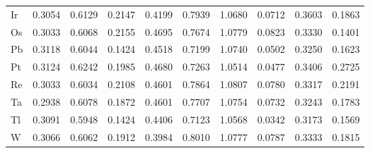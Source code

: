 \documentclass[a4paper, 12pt]{article}
\begin{document}
\begin{table}[htbp]
{\begin{tabular}{l *{9}{l}}
      Ir & 0.3054 & 0.6129 & 0.2147 & 0.4199 & 0.7939 & 1.0680 & 0.0712 & 0.3603 & 0.1863 \\
      Os & 0.3033 & 0.6068 & 0.2155 & 0.4695 & 0.7674 & 1.0779 & 0.0823 & 0.3330 & 0.1401 \\
      Pb & 0.3118 & 0.6044 & 0.1424 & 0.4518 & 0.7199 & 1.0740 & 0.0502 & 0.3250 & 0.1623 \\
      Pt & 0.3124 & 0.6242 & 0.1985 & 0.4680 & 0.7263 & 1.0514 & 0.0477 & 0.3406 & 0.2725 \\
      Re & 0.3033 & 0.6034 & 0.2108 & 0.4601 & 0.7864 & 1.0807 & 0.0780 & 0.3317 & 0.2191 \\
      Ta & 0.2938 & 0.6078 & 0.1872 & 0.4601 & 0.7707 & 1.0754 & 0.0732 & 0.3243 & 0.1783 \\
      Tl & 0.3091 & 0.5948 & 0.1424 & 0.4406 & 0.7123 & 1.0568 & 0.0342 & 0.3173 & 0.1569 \\
      W  & 0.3066 & 0.6062 & 0.1912 & 0.3984 & 0.8010 & 1.0777 & 0.0787 & 0.3333 & 0.1815 \\
      \bottomrule
    \end{tabular}
  }
\end{table}
\end{document}
